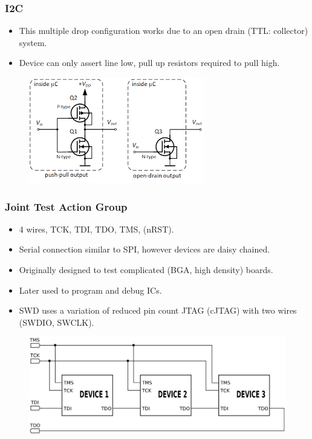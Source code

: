 \documentclass[t]{beamer}
\begin{document}

\begin{frame}[t]
\frametitle{I2C}
\begin{itemize}
	\item This multiple drop configuration works due to an open drain (TTL: collector) system. 
	\item Device can only assert line low, pull up resistors required to pull high.  
\end{itemize}
\begin{figure}
	\includegraphics[width=0.5\linewidth]{openDrain.png}
\end{figure}

\end{frame}


\begin{frame}[t]
\frametitle{Joint Test Action Group}
\begin{itemize}
	\item 4 wires, TCK, TDI, TDO, TMS, (nRST).
	\item Serial connection similar to SPI, however devices are daisy chained. 
	\item Originally designed to test complicated (BGA, high density) boards.
	\item Later used to program and debug ICs.
	\item SWD uses a variation of reduced pin count JTAG (cJTAG) with two wires (SWDIO, SWCLK). 
\end{itemize}
\begin{figure}
	\includegraphics[width=0.7\linewidth]{jtagChain.png}
\end{figure}

\end{frame}
\end{document}
